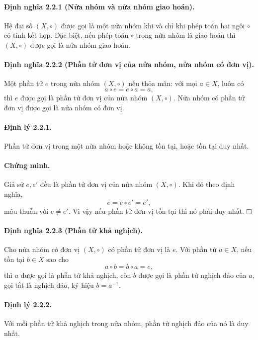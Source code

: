 \documentclass[11pt]{article}
\newcommand{\proofbox}{\ensuremath{\vcenter{\hrule height 0.45pt
  \hbox{\vrule width 0.45pt height 6pt\kern 6pt\vrule width 0.45pt}
  \hrule height 0.45pt}}}
\begin{document}
\paragraph{Định nghĩa 2.2.1 (Nửa nhóm và nửa nhóm giao hoán).}
Hệ đại số \((X,\circ)\) được gọi là một nửa nhóm khi và chỉ khi phép toán hai
ngôi \(\circ\) có tính kết hợp. Đặc biệt, nếu phép toán \(\circ\) trong nửa nhóm
là giao hoán thì \((X,\circ)\) được gọi là nửa nhóm giao hoán.

\paragraph{Định nghĩa 2.2.2 (Phần tử đơn vị của nửa nhóm, nửa nhóm có đơn vị).}
Một phần tử \(e\) trong nửa nhóm \((X,\circ)\) nếu thỏa mãn: với mọi \(a\in X\),
luôn có
\[
  a\circ e=e\circ a=a,
\]
thì \(e\) được gọi là phần tử đơn vị của nửa nhóm \((X,\circ)\). Nửa nhóm có
phần tử đơn vị được gọi là nửa nhóm có đơn vị.

\paragraph{Định lý 2.2.1.}
Phần tử đơn vị trong một nửa nhóm hoặc không tồn tại, hoặc tồn tại duy nhất.

\paragraph{Chứng minh.}
Giả sử \(e,e'\) đều là phần tử đơn vị của nửa nhóm \((X,\circ)\). Khi đó theo
định nghĩa,
\[
  e=e\circ e'=e',
\]
mâu thuẫn với \(e\ne e'\). Vì vậy nếu phần tử đơn vị tồn tại thì nó phải duy
nhất. \(\proofbox\)

\paragraph{Định nghĩa 2.2.3 (Phần tử khả nghịch).}
Cho nửa nhóm có đơn vị \((X,\circ)\) có phần tử đơn vị là \(e\). Với phần tử
\(a\in X\), nếu tồn tại \(b\in X\) sao cho
\[
  a\circ b=b\circ a=e,
\]
thì \(a\) được gọi là phần tử khả nghịch, còn \(b\) được gọi là phần tử nghịch
đảo của \(a\), gọi tắt là nghịch đảo, ký hiệu \(b=a^{-1}\).

\paragraph{Định lý 2.2.2.}
Với mỗi phần tử khả nghịch trong nửa nhóm, phần tử nghịch đảo của nó là duy
nhất.
\end{document}
